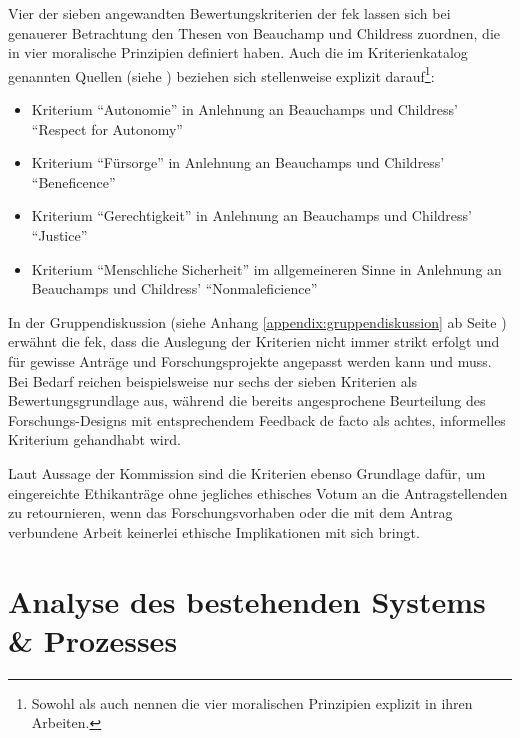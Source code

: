 \documentclass[a4paper,12pt,twoside,numbers=noendperiod]{scrreprt}
\begin{document}
Vier der sieben angewandten Bewertungskriterien der \ac{fek} lassen sich bei genauerer Betrachtung den Thesen von Beauchamp und Childress zuordnen, die in \cite{beauchamp_principles_1994} vier moralische Prinzipien definiert haben. Auch die im Kriterienkatalog genannten Quellen (siehe \cite[2]{forschungsethik-kommission_der_fachhochschule_vorarlberg_kriterienkatalog_2021}) beziehen sich stellenweise explizit darauf\footnote{Sowohl \cite{marckmann_was_2000} als auch \cite{schuchter_care_2018} nennen die vier moralischen Prinzipien explizit in ihren Arbeiten.}:
\begin{itemize}
    \item Kriterium \enquote{Autonomie} in Anlehnung an Beauchamps und Childress' \enquote{Respect for Autonomy} \cite[101-149]{beauchamp_principles_1994}
    \item Kriterium \enquote{Fürsorge} in Anlehnung an Beauchamps und Childress' \enquote{Beneficence} \cite[202-248]{beauchamp_principles_1994}
    \item Kriterium \enquote{Gerechtigkeit} in Anlehnung an Beauchamps und Childress' \enquote{Justice} \cite[249-301]{beauchamp_principles_1994}
    \item Kriterium \enquote{Menschliche Sicherheit} im allgemeineren Sinne in Anlehnung an Beauchamps und Childress' \enquote{Nonmaleficience} \cite[150-201]{beauchamp_principles_1994}
\end{itemize}

In der Gruppendiskussion (siehe Anhang \ref{appendix:gruppendiskussion} ab Seite \pageref{appendix:gruppendiskussion}) erwähnt die \acl{fek}, dass die Auslegung der Kriterien nicht immer strikt erfolgt und für gewisse Anträge und Forschungsprojekte angepasst werden kann und muss. Bei Bedarf reichen beispielsweise nur sechs der sieben Kriterien als Bewertungsgrundlage aus, während die bereits angesprochene Beurteilung des Forschungs-Designs mit entsprechendem Feedback de facto als achtes, informelles Kriterium gehandhabt wird.

Laut Aussage der Kommission sind die Kriterien ebenso Grundlage dafür, um eingereichte Ethikanträge ohne jegliches ethisches Votum an die Antragstellenden zu retournieren, wenn das Forschungsvorhaben oder die mit dem Antrag verbundene Arbeit keinerlei ethische Implikationen mit sich bringt.

\cleardoublepage
\chapter{Analyse des bestehenden Systems \& Prozesses}
\label{chap:analyse-bestehendes-system-prozess}
\end{document}
